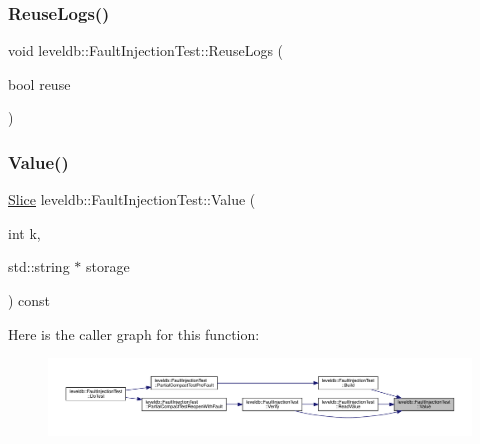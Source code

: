 \subsubsection{\texorpdfstring{ReuseLogs()}{ReuseLogs()}}
{\footnotesize\ttfamily void leveldb\+::\+Fault\+Injection\+Test\+::\+Reuse\+Logs (\begin{DoxyParamCaption}\item[{bool}]{reuse }\end{DoxyParamCaption})\hspace{0.3cm}{\ttfamily [inline]}}

\mbox{\label{classleveldb_1_1_fault_injection_test_a8922e4c2b543e52e42b513e8dffd65ae}} 
\subsubsection{\texorpdfstring{Value()}{Value()}}
{\footnotesize\ttfamily \mbox{\hyperlink{classleveldb_1_1_slice}{Slice}} leveldb\+::\+Fault\+Injection\+Test\+::\+Value (\begin{DoxyParamCaption}\item[{int}]{k,  }\item[{std\+::string $\ast$}]{storage }\end{DoxyParamCaption}) const\hspace{0.3cm}{\ttfamily [inline]}}

Here is the caller graph for this function\+:
\nopagebreak
\begin{figure}[H]
\begin{center}
\leavevmode
\includegraphics[width=350pt]{classleveldb_1_1_fault_injection_test_a8922e4c2b543e52e42b513e8dffd65ae_icgraph}
\end{center}
\end{figure}
\mbox{\label{classleveldb_1_1_fault_injection_test_a2c29a68922ed25a3c15713fc4780c76e}} 
